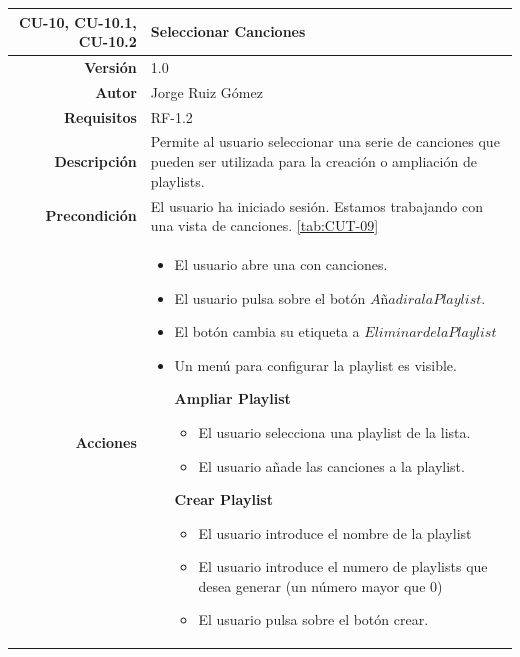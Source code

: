 \begin{table}[H]
    \centering
    \begin{tabular}{r|p{}}
    \hline
    \textbf{CU-10, CU-10.1, CU-10.2}  & \textbf{Seleccionar Canciones}                                 \\ \hline
    \textbf{Versión}       & 1.0                                                     \\
    \textbf{Autor}         & Jorge Ruiz Gómez                                        \\
    \textbf{Requisitos}    & RF-1.2                                       \\
    \textbf{Descripción}   & Permite al usuario seleccionar una serie de canciones que pueden ser utilizada para la creación o ampliación de playlists. \\ \hline
    \textbf{Precondición}  & El usuario ha iniciado sesión. Estamos trabajando con una vista de canciones. \ref{tab:CUT-09}  \\
    \textbf{Acciones}      &    \begin{itemize}
                                    \item El usuario abre una con canciones.
                                    \item El usuario pulsa sobre el botón $Añadir a la Playlist$.
                                    \item El botón cambia su etiqueta a $Eliminar de la Playlist$
                                    \item Un menú para configurar la playlist es visible.


                                            \textbf{Ampliar Playlist}
                                            \begin{itemize}
                                                \item El usuario selecciona una playlist de la lista.
                                                \item El usuario añade las canciones a la playlist.
                                            \end{itemize}
  
                                            \textbf{Crear Playlist}
                                            \begin{itemize}
                                                \item El usuario introduce el nombre de la playlist
                                                \item El usuario introduce el numero de playlists que desea generar (un número mayor que 0)
                                                \item El usuario pulsa sobre el botón crear.
                                            \end{itemize}


\end{itemize}
\end{tabular}
\end{table}
